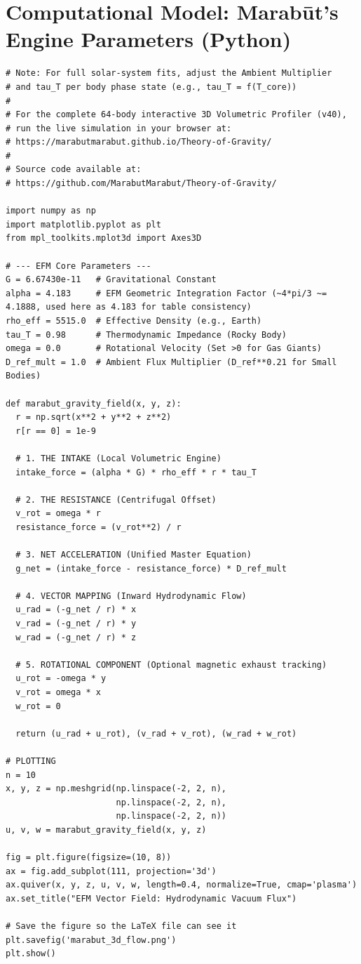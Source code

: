 \documentclass[11pt, a4paper]{article}
\begin{document}
\section{Computational Model: Marab\={u}t's Engine Parameters (Python)}
\begin{verbatim}
# Note: For full solar-system fits, adjust the Ambient Multiplier 
# and tau_T per body phase state (e.g., tau_T = f(T_core))
#
# For the complete 64-body interactive 3D Volumetric Profiler (v40), 
# run the live simulation in your browser at: 
# https://marabutmarabut.github.io/Theory-of-Gravity/
#
# Source code available at:
# https://github.com/MarabutMarabut/Theory-of-Gravity/

import numpy as np
import matplotlib.pyplot as plt
from mpl_toolkits.mplot3d import Axes3D

# --- EFM Core Parameters ---
G = 6.67430e-11   # Gravitational Constant
alpha = 4.183     # EFM Geometric Integration Factor (~4*pi/3 ~= 4.1888, used here as 4.183 for table consistency)
rho_eff = 5515.0  # Effective Density (e.g., Earth)
tau_T = 0.98      # Thermodynamic Impedance (Rocky Body)
omega = 0.0       # Rotational Velocity (Set >0 for Gas Giants)
D_ref_mult = 1.0  # Ambient Flux Multiplier (D_ref**0.21 for Small Bodies)

def marabut_gravity_field(x, y, z):
  r = np.sqrt(x**2 + y**2 + z**2)
  r[r == 0] = 1e-9 

  # 1. THE INTAKE (Local Volumetric Engine)
  intake_force = (alpha * G) * rho_eff * r * tau_T

  # 2. THE RESISTANCE (Centrifugal Offset)
  v_rot = omega * r
  resistance_force = (v_rot**2) / r

  # 3. NET ACCELERATION (Unified Master Equation)
  g_net = (intake_force - resistance_force) * D_ref_mult

  # 4. VECTOR MAPPING (Inward Hydrodynamic Flow)
  u_rad = (-g_net / r) * x
  v_rad = (-g_net / r) * y
  w_rad = (-g_net / r) * z
  
  # 5. ROTATIONAL COMPONENT (Optional magnetic exhaust tracking)
  u_rot = -omega * y
  v_rot = omega * x
  w_rot = 0

  return (u_rad + u_rot), (v_rad + v_rot), (w_rad + w_rot)

# PLOTTING
n = 10
x, y, z = np.meshgrid(np.linspace(-2, 2, n), 
                      np.linspace(-2, 2, n), 
                      np.linspace(-2, 2, n))
u, v, w = marabut_gravity_field(x, y, z)

fig = plt.figure(figsize=(10, 8))
ax = fig.add_subplot(111, projection='3d')
ax.quiver(x, y, z, u, v, w, length=0.4, normalize=True, cmap='plasma')
ax.set_title("EFM Vector Field: Hydrodynamic Vacuum Flux")

# Save the figure so the LaTeX file can see it
plt.savefig('marabut_3d_flow.png') 
plt.show()
\end{verbatim}
\end{document}
